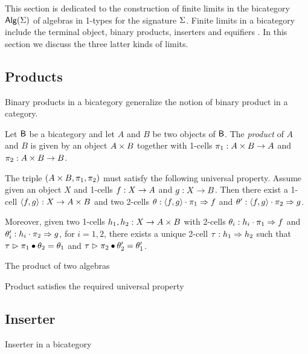 This section is dedicated to the construction of finite limits in the
bicategory $\mathsf{Alg}(\Sigma)$ of algebras in 1-types for the signature
$\Sigma$.  Finite limits in a bicategory include the terminal object,
binary products, inserters and equifiers
\cite{power1991characterization}. In this section we discuss the three
latter kinds of limits.

\subsection{Products}

Binary products in a bicategory generalize the notion of binary
product in a category.

\begin{definition}
Let $\mathsf{B}$ be a bicategory and let $A$ and $B$ be two objects of
$\mathsf{B}$. The \emph{product} of $A$ and $B$ is given by an object $A \times B$ together with 1-cells $\pi_1 : A \times B \rightarrow A$ and
$\pi_2 : A \times B \rightarrow B$.

The triple $(A \times B,\pi_1, \pi_2)$ must satisfy the following
universal property. Assume given an object $X$ and 1-cells $f : X
\rightarrow A$ and $g : X \rightarrow B$. Then there exist a 1-cell
$\langle f , g \rangle : X \rightarrow A \times B$ and two 2-cells $\theta :
\langle f , g \rangle \cdot \pi_1 \Rightarrow f$ and $\theta' : \langle f , g \rangle
\cdot \pi_2 \Rightarrow g$.

Moreover, given two 1-cells $h_1,h_2 : X \rightarrow A \times B$ with
2-cells $\theta_i : h_i \cdot \pi_1 \Rightarrow f$ and $\theta'_i : h_i
\cdot \pi_2 \Rightarrow g$, for $i= 1,2$, there exists a unique
2-cell $\tau : h_1 \Rightarrow h_2$ such that $\tau \vartriangleright
\pi_1 \bullet \theta_2 = \theta_1$ and $\tau \vartriangleright \pi_2 \bullet
\theta'_2 = \theta'_1$.
\end{definition} 

\begin{definition}
The product of two algebras
\end{definition}

\begin{proposition}
Product satisfies the required universal property
\end{proposition}

\subsection{Inserter}

\begin{definition}
Inserter in a bicategory
\end{definition}

